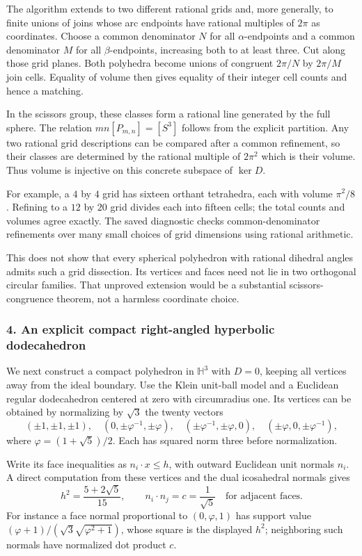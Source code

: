 \documentclass[11pt]{article}
\begin{document}
The algorithm extends to two different rational grids and, more generally, to finite unions of joins whose arc endpoints have rational multiples of $2\pi$ as coordinates. Choose a common denominator $N$ for all $\alpha$-endpoints and a common denominator $M$ for all $\beta$-endpoints, increasing both to at least three. Cut along those grid planes. Both polyhedra become unions of congruent $2\pi/N$ by $2\pi/M$ join cells. Equality of volume then gives equality of their integer cell counts and hence a matching.

In the scissors group, these classes form a rational line generated by the full sphere. The relation $mn[P_{m,n}]=[S^3]$ follows from the explicit partition. Any two rational grid descriptions can be compared after a common refinement, so their classes are determined by the rational multiple of $2\pi^2$ which is their volume. Thus volume is injective on this concrete subspace of $\ker D$.

For example, a $4$ by $4$ grid has sixteen orthant tetrahedra, each with volume $\pi^2/8$. Refining to a $12$ by $20$ grid divides each into fifteen cells; the total counts and volumes agree exactly. The saved diagnostic checks common-denominator refinements over many small choices of grid dimensions using rational arithmetic.

This does not show that every spherical polyhedron with rational dihedral angles admits such a grid dissection. Its vertices and faces need not lie in two orthogonal circular families. That unproved extension would be a substantial scissors-congruence theorem, not a harmless coordinate choice.

\subsubsection{4. An explicit compact right-angled hyperbolic dodecahedron}
We next construct a compact polyhedron in $\mathbb H^3$ with $D=0$, keeping all vertices away from the ideal boundary. Use the Klein unit-ball model and a Euclidean regular dodecahedron centered at zero with circumradius one. Its vertices can be obtained by normalizing by $\sqrt3$ the twenty vectors
\[
 (\pm1,\pm1,\pm1),\quad
 (0,\pm\varphi^{-1},\pm\varphi),\quad
 (\pm\varphi^{-1},\pm\varphi,0),\quad
 (\pm\varphi,0,\pm\varphi^{-1}),
\]
where $\varphi=(1+\sqrt5)/2$. Each has squared norm three before normalization.

Write its face inequalities as $n_i\cdot x\le h$, with outward Euclidean unit normals $n_i$. A direct computation from these vertices and the dual icosahedral normals gives
\[
 h^2=\frac{5+2\sqrt5}{15},\qquad
 n_i\cdot n_j=c=\frac1{\sqrt5}
 \quad\text{for adjacent faces}.                     \tag{4}
\]
For instance a face normal proportional to $(0,\varphi,1)$ has support value
$(\varphi+1)/(\sqrt3\sqrt{\varphi^2+1})$, whose square is the displayed $h^2$; neighboring such normals have normalized dot product $c$.
\end{document}
